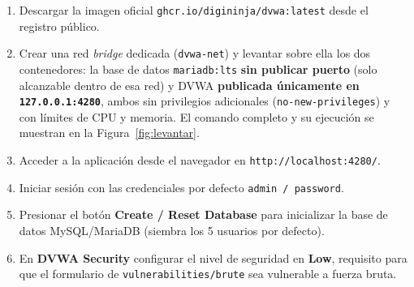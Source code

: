\documentclass[letter,12pt]{article}
\begin{document}
\begin{enumerate}
    \item Descargar la imagen oficial \texttt{ghcr.io/digininja/dvwa:latest} desde el registro público.
    \item Crear una red \emph{bridge} dedicada (\texttt{dvwa-net}) y levantar sobre ella los dos contenedores: la base de datos \texttt{mariadb:lts} \textbf{sin publicar puerto} (solo alcanzable dentro de esa red) y DVWA \textbf{publicada únicamente en \texttt{127.0.0.1:4280}}, ambos sin privilegios adicionales (\texttt{no-new-privileges}) y con límites de CPU y memoria. El comando completo y su ejecución se muestran en la Figura~\ref{fig:levantar}.
    \item Acceder a la aplicación desde el navegador en \texttt{http://localhost:4280/}.
    \item Iniciar sesión con las credenciales por defecto \texttt{admin / password}.
    \item Presionar el botón \textbf{Create / Reset Database} para inicializar la base de datos MySQL/MariaDB (siembra los 5 usuarios por defecto).
    \item En \textbf{DVWA Security} configurar el nivel de seguridad en \textbf{Low}, requisito para que el formulario de \texttt{vulnerabilities/brute} sea vulnerable a fuerza bruta.
\end{enumerate}

\end{document}
